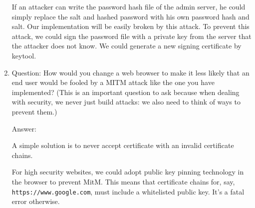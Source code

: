 \begin{enumerate}[(1)]
If an attacker can write the password hash file of the admin server, he could simply replace the salt and hashed password with his own password hash and salt. Our implementation will be easily broken by this attack. To prevent this attack, we could sign the password file with a private key from the server that the attacker does not know. We could generate a new signing certificate by keytool. 

\item Question:
How would you change a web browser to make it less likely that an end user would be
fooled by a MITM attack like the one you have implemented? (This is an important
question to ask because when dealing with security, we never just build attacks: we
also need to think of ways to prevent them.)

Answer: 

A simple solution is to never accept certificate with an invalid certificate chains. 

For high security websites, we could adopt public key pinning technology in the browser to prevent MitM. This means that certificate chains for, say, \texttt{https://www.google.com}, must include a whitelisted public key. It's a fatal error otherwise. 


\end{enumerate}



